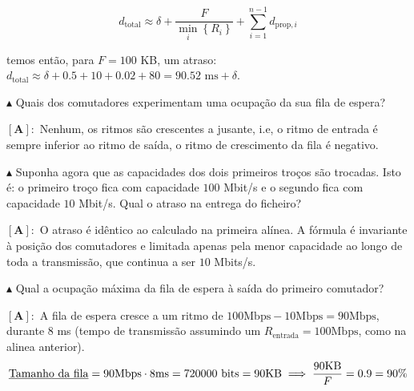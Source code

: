 \vspace{-1em}
$$
    d_{\text{total}} \approx \delta  + \frac{F}{\displaystyle \min_i\left\{R_i\right\}} + \sum_{i=1}^{n-1} d_{\text{prop},i}
$$

\vspace{-0.25em}
\noindent temos então, para $F = 100$ KB, um atraso: $d_{\text{total}} \approx \delta + 0.5 + 10 + 0.02 + 80 = 90.52\text{ ms} + \delta$.

\vspace{1 em}
\noindent $\blacktriangle$ Quais dos comutadores experimentam uma ocupação da sua fila de espera?

\vspace{0.75 em}
\noindent $\pmb{[\textbf{A}]:}$ Nenhum, os ritmos são crescentes a jusante, i.e, o ritmo de entrada é sempre inferior ao ritmo de saída, o ritmo de crescimento da fila é negativo.

\vspace{1 em}
\noindent $\blacktriangle$ Suponha agora que as capacidades dos dois primeiros troços são trocadas. Isto é: o primeiro troço fica com capacidade $100$ Mbit/s e o segundo fica com capacidade $10$ Mbit/s. Qual o atraso na entrega do ficheiro?

\vspace{0.75 em}
\noindent $\pmb{[\textbf{A}]:}$ O atraso é idêntico ao calculado na primeira alínea. A fórmula é invariante à posição dos comutadores e limitada apenas pela menor capacidade ao longo de toda a transmissão, que continua a ser $10$ Mbits/s.

\vspace{1 em}
\noindent $\blacktriangle$ Qual a ocupação máxima da fila de espera à saída do primeiro comutador? 

\vspace{0.75 em}
\noindent $\pmb{[\textbf{A}]:}$ A fila de espera cresce a um ritmo de $100\text{Mbps} - 10\text{Mbps} = 90\text{Mbps}$, durante $8$ ms (tempo de transmissão assumindo um $R_{\text{entrada}} = 100\text{Mbps}$, como na alinea anterior).
$$
    \text{\underline{Tamanho da fila}} = 90\text{Mbps} \cdot 8\text{ms} = 720000 \text{ bits} = 90 \text{KB} \implies \frac{90\text{KB}}{F} = 0.9 = 90\%
$$
